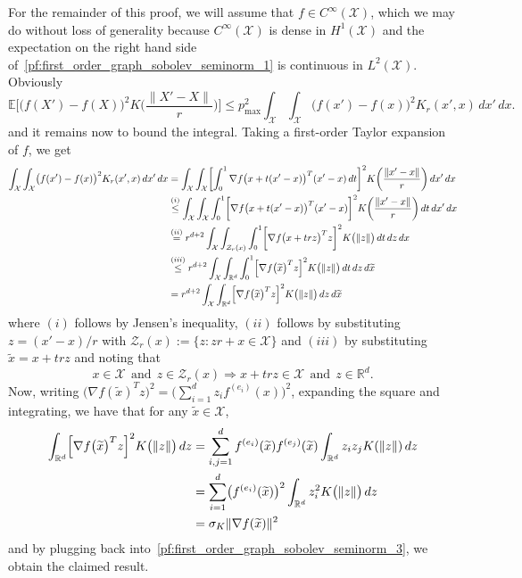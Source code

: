 \documentclass[twoside]{article}
\newcommand{\Reals}{\mathbb{R}}
\newcommand{\1}{\mathbf{1}}
\newcommand{\Rd}{\Reals^d}
\newcommand{\Xset}{\mathcal{X}}
\newcommand{\Leb}{L}
\newcommand{\mc}[1]{\mathcal{#1}}
\newcommand{\Ebb}{\mathbb{E}}
\newcommand{\wt}[1]{\widetilde{#1}}
\theoremstyle{definition}
\theoremstyle{remark}
\begin{document}
For the remainder of this proof, we will assume that $f \in C^{\infty}(\Xset)$, which we may do without loss of generality because $C^{\infty}(\Xset)$ is dense in $H^1(\Xset)$ and the expectation on the right hand side of~\eqref{pf:first_order_graph_sobolev_seminorm_1} is continuous in $\Leb^2(\Xset)$. Obviously
\begin{equation}
\Ebb\biggl[\bigl(f(X') - f(X)\bigr)^2K\biggl(\frac{\|X' - X\|}{r}\biggr)\biggr] \leq p_{\max}^2 \int_{\Xset} \int_{\Xset} \bigl(f(x') - f(x)\bigr)^2 K_r(x',x) \,dx' \,dx. \label{pf:first_order_graph_sobolev_seminorm_2}
\end{equation}
and it remains now to bound the integral. Taking a first-order Taylor expansion of $f$, we get
\begin{align}
\int_{\Xset} \int_{\Xset} \bigl(f(x') - f(x)\bigr)^2 K_r(x',x) \,dx' \,dx & = \int_{\Xset} \int_{\Xset} \biggl[\int_{0}^{1} \nabla f\bigl(x + t(x' - x)\bigr)^T (x' - x)\,dt\biggr]^2 K\biggl(\frac{\|x' - x\|}{r}\biggr) \,dx' \,dx \nonumber \\
& \overset{(i)}{\leq} \int_{\Xset} \int_{\Xset} \int_{0}^{1} \biggl[\nabla f\bigl(x + t(x' - x)\bigr)^T (x' - x)\biggr]^2 K\biggl(\frac{\|x' - x\|}{r}\biggr) \,dt\,dx' \,dx \nonumber \\
& \overset{(ii)}{=} r^{d + 2} \int_{\Xset} \int_{\mc{Z}_r(x)} \int_{0}^{1} \biggl[\nabla f\bigl(x + trz\bigr)^T z\biggr]^2 K\bigl(\|z\|\bigr) \,dt\,dz \,dx \\
&  \overset{(iii)}{\leq} r^{d + 2} \int_{\Xset} \int_{\Reals^d} \int_{0}^{1} \Bigl[\nabla f\bigl(\wt{x}\bigr)^T z\Bigr]^2 K\bigl(\|z\|\bigr) \,dt \,dz \,d\wt{x} \nonumber \\
& = r^{d + 2} \int_{\Xset} \int_{\Reals^d} \Bigl[\nabla f\bigl(\wt{x}\bigr)^T z\Bigr]^2 K\bigl(\|z\|\bigr) \,dz \,d\wt{x} \label{pf:first_order_graph_sobolev_seminorm_3}
\end{align}
where $(i)$ follows by Jensen's inequality, $(ii)$ follows by substituting $z = (x' - x)/r$ with $\mc{Z}_r(x) := \{z: zr + x \in \Xset\}$ and $(iii)$ by substituting $\wt{x} = x + trz$ and noting that
\begin{equation*}
x \in \Xset ~~\textrm{and}~~ z \in \mc{Z}_r(x) \Longrightarrow x + trz \in \Xset ~~\textrm{and}~~ z \in \Reals^d.
\end{equation*}
Now, writing $\bigl(\nabla f(\wt{x}) ^T z\bigr)^2 = \bigl(\sum_{i = 1}^{d} z_{i} f^{(e_i)}(x) \bigr)^2$, expanding the square and integrating, we have that for any $\wt{x} \in \Xset$,
\begin{align*}
\int_{\Reals^d} \Bigl[\nabla f\bigl(\wt{x}\bigr)^T z\Bigr]^2 K\bigl(\|z\|\bigr) \,dz & = \sum_{i,j = 1}^{d} f^{(e_i)}(\wt{x}) f^{(e_j)}(\wt{x}) \int_{\Rd} z_iz_jK(\|z\|) \,dz \\
& = \sum_{i = 1}^{d} \bigl(f^{(e_i)}(\wt{x})\bigr)^2 \int_{\Rd} z_i^2 K\bigl(\|z\|\bigr) \,dz \\
& = \sigma_K \|\nabla f(\wt{x})\|^2
\end{align*}
and by plugging back into~\eqref{pf:first_order_graph_sobolev_seminorm_3}, we obtain the claimed result. 
\end{document}
